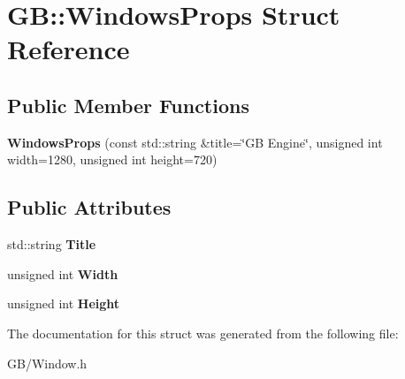 \hypertarget{struct_g_b_1_1_windows_props}{}\section{GB\+::Windows\+Props Struct Reference}
\label{struct_g_b_1_1_windows_props}
\subsection*{Public Member Functions}
\begin{DoxyCompactItemize}
\item 
\mbox{\label{struct_g_b_1_1_windows_props_ab35529495009c85edd2d5bc8ea234315}} 
{\bfseries Windows\+Props} (const std\+::string \&title=\char`\"{}GB Engine\char`\"{}, unsigned int width=1280, unsigned int height=720)
\end{DoxyCompactItemize}
\subsection*{Public Attributes}
\begin{DoxyCompactItemize}
\item 
\mbox{\label{struct_g_b_1_1_windows_props_a94a36658e2af2c7e59f06816a4101a4d}} 
std\+::string {\bfseries Title}
\item 
\mbox{\label{struct_g_b_1_1_windows_props_ae42b18de831daafd73b9ea87ee35d87f}} 
unsigned int {\bfseries Width}
\item 
\mbox{\label{struct_g_b_1_1_windows_props_a3a516927b86ed914410e22cf3aa0f416}} 
unsigned int {\bfseries Height}
\end{DoxyCompactItemize}


The documentation for this struct was generated from the following file\+:\begin{DoxyCompactItemize}
\item 
G\+B/Window.\+h\end{DoxyCompactItemize}
